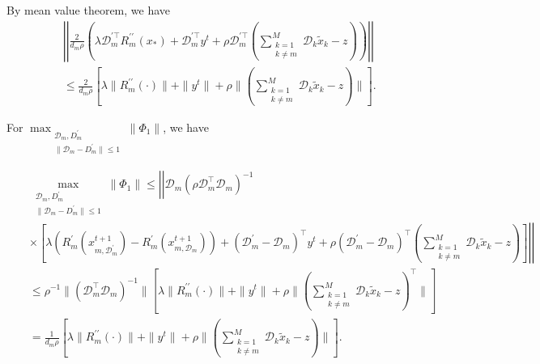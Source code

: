 By mean value theorem, we have
\begin{eqnarray*}
&&\left|\left|\frac{2}{d_m\rho}
\left(
  \lambda\mathcal{D}_m^{\prime\top} R_m^{\prime\prime}(x_{\ast})+\mathcal{D}_m^{\prime\top}y^t+\rho\mathcal{D}_m^{\prime\top}(\sum_{\substack
{k=1\\k\neq m}}^{M}\mathcal{D}_k\tilde{x}_k-z)
\right)\right|\right|\\
&&\leq\frac{2}{d_m\rho}\left[\lambda\| R_m^{\prime\prime}(\cdot)\|
+\|y^t\|+\rho\|(\sum_{\substack
{k=1\\k\neq m}}^{M}\mathcal{D}_k\tilde{x}_k-z)\|
\right].
\end{eqnarray*}

For $\max_{\substack{\mathcal{D}_m,D_m^{\prime}\\
\|\mathcal{D}_m-D_m^{\prime}\|\leq1
}}\|\Phi_1\|$, we have

\begin{eqnarray*}
&&\max_{\substack{\mathcal{D}_m,D_m^{\prime}\\
\|\mathcal{D}_m-D_m^{\prime}\|\leq1
}}\|
\Phi_1
\|
\leq
\left|\left|
\mathcal{D}_m(\rho \mathcal{D}_m^\top \mathcal{D}_m)^{-1}\right.\right.\\
&&\left.\left.\times\left[
\lambda (R_m^{\prime}(x_{m,\mathcal{D}_m^{\prime}}^{t+1})-R_m^{\prime}(x_{m,\mathcal{D}_m}^{t+1}))
+(\mathcal{D}_m^{\prime}-\mathcal{D}_m)^\top y^t+\rho
(\mathcal{D}_m^{\prime}-\mathcal{D}_m)^\top (\sum_{\substack
{k=1\\k\neq m}}^{M}\mathcal{D}_k\tilde{x}_k-z)
\right]
\right|\right|\\
&&\leq
\rho^{-1}\|(\mathcal{D}_m^\top \mathcal{D}_m)^{-1}\|
\left[\lambda \|R_m^{\prime\prime}(\cdot)\|+\|y^t\|+\rho\|(\sum_{\substack
{k=1\\k\neq m}}^{M}\mathcal{D}_k\tilde{x}_k-z)^\top\|\right]\\
&&=\frac{1}{d_m\rho}\left[\lambda \|R_m^{\prime\prime}(\cdot)\|+\|y^t\|+\rho\|(\sum_{\substack
{k=1\\k\neq m}}^{M}\mathcal{D}_k\tilde{x}_k-z)\|\right].
\end{eqnarray*}




